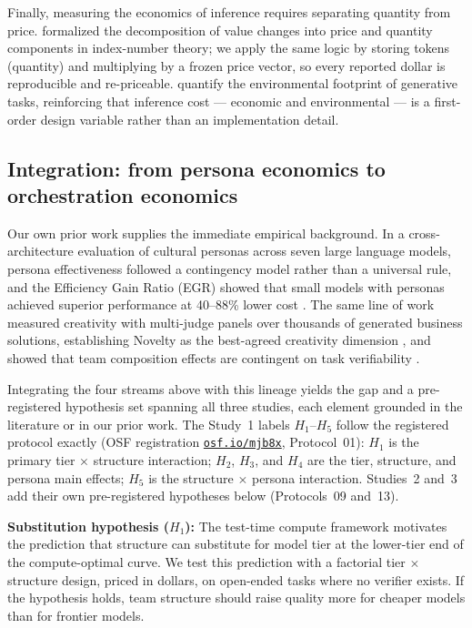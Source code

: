 \documentclass[12pt,a4paper]{article}
\begin{document}
Finally, measuring the economics of inference requires separating quantity from
price. \citet{Diewert1976} formalized the decomposition of value changes into
price and quantity components in index-number theory; we apply the same logic
by storing tokens (quantity) and multiplying by a frozen price vector, so every
reported dollar is reproducible and re-priceable. \citet{TomlinsonEtAl2024}
quantify the environmental footprint of generative tasks, reinforcing that
inference cost --- economic and environmental --- is a first-order design
variable rather than an implementation detail.

\subsection{Integration: from persona economics to orchestration economics}\label{sec:hypotheses}

Our own prior work supplies the immediate empirical background. In a
cross-architecture evaluation of cultural personas across seven large language
models, persona effectiveness followed a contingency model rather than a
universal rule, and the Efficiency Gain Ratio (EGR) showed that small models
with personas achieved superior performance at 40--88\% lower cost
\citep{Hariri2026b}. The same line of work measured creativity with multi-judge
panels over thousands of generated business solutions, establishing Novelty as
the best-agreed creativity dimension \citep{Hariri2025a}, and showed that team
composition effects are contingent on task verifiability \citep{Hariri2025b}.

Integrating the four streams above with this lineage yields the gap and a
pre-registered hypothesis set spanning all three studies, each element grounded
in the literature or in our prior work. The Study~1 labels $H_1$--$H_5$ follow
the registered protocol exactly (OSF registration
\href{https://osf.io/mjb8x}{\texttt{osf.io/mjb8x}}, Protocol~01): $H_1$ is the
primary tier $\times$ structure interaction; $H_2$, $H_3$, and $H_4$ are the
tier, structure, and persona main effects; $H_5$ is the structure $\times$
persona interaction. Studies~2 and~3 add their own pre-registered hypotheses
below (Protocols~09 and~13).

\medskip
\noindent\textbf{Substitution hypothesis ($H_1$):} The test-time compute
framework \citep{SnellEtAl2024} motivates the prediction that structure can
substitute for model tier at the lower-tier end of the compute-optimal curve. We
test this prediction with a factorial tier $\times$ structure design, priced in
dollars, on open-ended tasks where no verifier exists. If the hypothesis holds,
team structure should raise quality more for cheaper models than for frontier
models.
\end{document}
